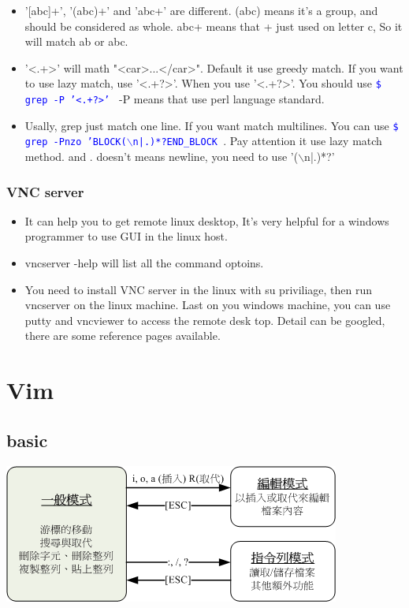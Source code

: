 \documentclass[a4paper,12pt,twoside]{book}
\newcommand{\linuxcommand}[1]{\texttt{\textcolor{blue}{\$ #1 \Pisymbol{psy}{191}}}}
\begin{document}
\begin{itemize}
\begin{tabular}{|p{}|p{}|p{}|}
\end{tabular}

\item '[abc]+',  '(abc)+' and 'abc+' are different.  (abc) means it's a group, and should be considered as whole. abc+ means that + just used on letter c, So it will match ab or abc.  

\item '<.+>' will math "<car>...</car>". Default it use greedy match. If you want to use lazy match, use '<.+?>'. When you use '<.+?>'.  You should use \linuxcommand{grep -P '<.+?>'} -P means that use perl language standard. 

\item Usally, grep just match one line. If you want match multilines. You can use \linuxcommand{grep -Pnzo 'BLOCK($\backslash$n|.)*?END\_BLOCK }.  Pay attention it use lazy match method. and . doesn't means newline, you need to use '($\backslash$n|.)*?'


\end{itemize}


\subsection{VNC server}
\begin{itemize}
 \item It can help you to get remote linux desktop, It's very helpful for a windows programmer to use GUI in the linux host.
 \item vncserver -help will list all the command optoins.
 \item  You need to install VNC server in the linux with su priviliage, then run vncserver on the linux machine. Last on you windows machine, you can use putty and vncviewer to access the remote desk top. Detail can be googled, there are some reference pages available.
\end{itemize}


\chapter{Vim}
\section{basic}

\includegraphics[scale=0.8]{pics/vi-mode} \\
\end{document}

